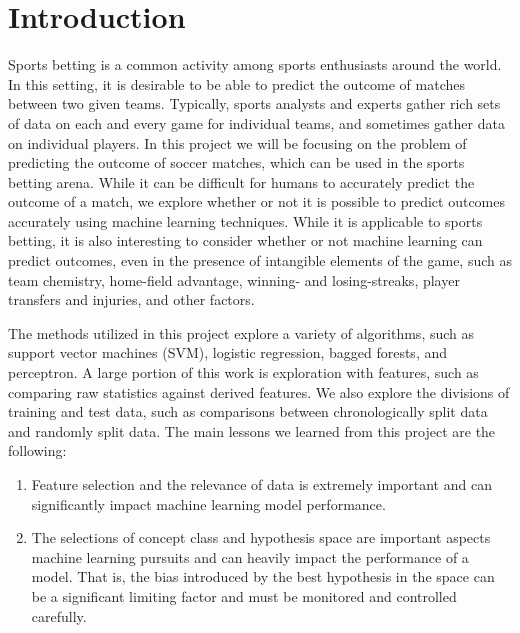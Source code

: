 \section{Introduction} 

Sports betting is a common activity among sports enthusiasts around the world. In this setting, it is desirable to be able to predict the outcome of matches between two given teams. Typically, sports analysts and experts gather rich sets of data on each and every game for individual teams, and sometimes gather data on individual players. In this project we will be focusing on the problem of predicting the outcome of soccer matches, which can be used in the sports betting arena. While it can be difficult for humans to accurately predict the outcome of a match, we explore whether or not it is possible to predict outcomes accurately using machine learning techniques. While it is applicable to sports betting, it is also interesting to consider whether or not machine learning can predict outcomes, even in the presence of intangible elements of the game, such as team chemistry, home-field advantage, winning- and losing-streaks, player transfers and injuries, and other factors.

The methods utilized in this project explore a variety of algorithms, such as support vector machines (SVM), logistic regression, bagged forests, and perceptron. A large portion of this work is exploration with features, such as comparing raw statistics against derived features. We also explore the divisions of training and test data, such as comparisons between chronologically split data and randomly split data. The main lessons we learned from this project are the following:

\begin{enumerate}
\item Feature selection and the relevance of data is extremely important and can significantly impact machine learning model performance.
\item The selections of concept class and hypothesis space are important aspects machine learning pursuits and can heavily impact the performance of a model. That is, the bias introduced by the best hypothesis in the space can be a significant limiting factor and must be monitored and controlled carefully.
\end{enumerate}

